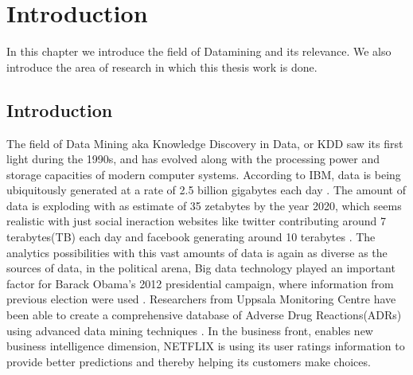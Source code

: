 \chapter{Introduction}


\textsf{%
In this chapter we introduce the field of Datamining and its relevance. We
also introduce the area of research in which this thesis work is done.}

\section{Introduction}
The field of Data Mining aka Knowledge Discovery in Data, or KDD saw its first
light during the 1990s, and has evolved along with the processing power and
storage capacities of modern computer systems. According to IBM, data is being
ubiquitously generated at a rate of 2.5 billion gigabytes each day
\cite{IBM_BigData:online}. The amount of data is exploding with as estimate of
35 zetabytes by the year 2020, which seems realistic with just social ineraction
websites like twitter contributing around 7 terabytes(TB) each day and facebook
generating around 10 terabytes \cite{IBM-BigData}. The analytics possibilities
with this vast amounts of data is again as diverse as the sources of data, in
the political arena, Big data technology played an important factor for Barack
Obama's 2012 presidential campaign, where information from previous election
were used \cite{BarackObama}. Researchers from Uppsala Monitoring Centre have
been able to create a comprehensive database of Adverse Drug Reactions(ADRs)
using advanced data mining techniques \cite{UppsalaMonitoring}. In the business
front, enables new business intelligence dimension, NETFLIX is using its user
ratings information to provide better predictions and thereby helping its
customers make choices. 

